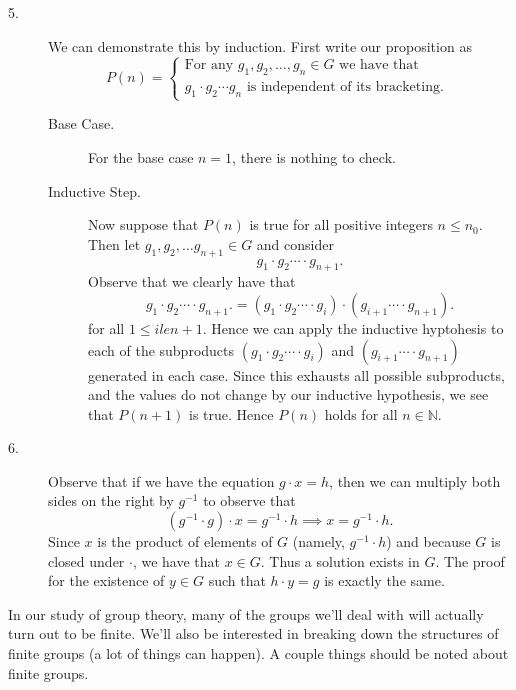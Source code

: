 \begin{prf}
\begin{description}
        \item[5.] We can demonstrate this by induction. First write
        our proposition as
        \[
            P(n)
            =
            \begin{cases}
            \text{For any } g_1, g_2, \dots, g_n \in G\text{ we have that }\\
             g_1\cdot g_2 \cdots g_n \text{ is independent of its bracketing. }
            \end{cases}
        \] 
        \begin{description}
            \item[Base Case.]
            For the base case $n = 1$, there is nothing to check.
            \item[Inductive Step.]
            Now suppose that $P(n)$ is true for all positive integers
            $n \le n_0$. Then let $g_1, g_2, \dots g_{n+1}
            \in G$ and consider 
            \[
                g_1\cdot g_2 \cdots \cdot g_{n+1}.
            \]
            Observe that we clearly have that 
            \[
                g_1\cdot g_2 \cdots \cdot g_{n+1}. = (g_1\cdot g_2 \cdots \cdot g_{i})\cdot(g_{i+1} \cdots \cdot g_{n+1}).
            \]
            for all $1 \le i le n + 1$. Hence we can apply the
            inductive hyptohesis to each of the subproducts $(g_1\cdot
            g_2 \cdots \cdot g_{i})$ and $(g_{i+1} \cdots \cdot
            g_{n+1})$ generated
            in each case. Since this exhausts all possible
            subproducts, and the values do not change by our inductive
            hypothesis, we see that $P(n + 1)$ is true. Hence $P(n)$
            holds for all $n \in \mathbb{N}$. 
        \end{description}

        \item[6.] Observe that if we have the equation $g \cdot x =
        h$, then we can multiply both sides on the right by $g^{-1}$
        to observe that 
        \[
            (g^{-1} \cdot g) \cdot x = g^{-1} \cdot h \implies x = g^{-1} \cdot h.
        \]
        Since $x$ is the product of elements of $G$ (namely, $g^{-1}
        \cdot h$) and because $G$ is closed under $\cdot$, we have
        that $x \in G$. Thus a solution exists in $G$. The proof for
        the existence of $y \in G$ such that $h \cdot y = g$ is
        exactly the same.
    \end{description}
\end{prf}

In our study of group theory, many of the groups we'll deal with will
actually turn out to be finite. We'll also be interested in breaking
down the structures of finite groups (a lot of things can happen). 
A couple things should be noted about finite groups.

